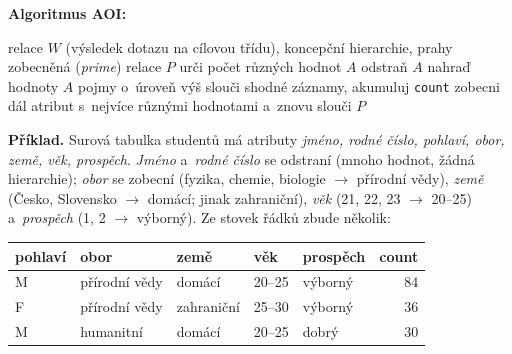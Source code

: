 \documentclass[11pt,a4paper]{article}
\theoremstyle{definition}
\begin{document}
\noindent\textbf{Algoritmus AOI:}
\begin{algorithmic}[1]
\Require relace $W$ (výsledek dotazu na cílovou třídu), koncepční hierarchie, prahy
\Ensure zobecněná (\emph{prime}) relace $P$
  \State urči počet různých hodnot $A$
    \State odstraň $A$ 
  \Else
      \State nahraď hodnoty $A$ pojmy o~úroveň výš 
    \EndWhile
  \EndIf
\EndFor
\State slouči shodné záznamy, akumuluj \texttt{count}
  \State zobecni dál atribut s~nejvíce různými hodnotami a~znovu slouči
\EndWhile
\State \Return $P$
\end{algorithmic}

\medskip
\noindent\textbf{Příklad.} Surová tabulka studentů má atributy
\emph{jméno, rodné číslo, pohlaví, obor, země, věk, prospěch}.
\emph{Jméno} a~\emph{rodné číslo} se odstraní (mnoho hodnot, žádná hierarchie);
\emph{obor} se zobecní (fyzika, chemie, biologie $\to$ přírodní vědy),
\emph{země} (Česko, Slovensko $\to$ domácí; jinak zahraniční),
\emph{věk} (21, 22, 23 $\to$ 20--25) a~\emph{prospěch} (1, 2 $\to$ výborný).
Ze stovek řádků zbude několik:

\begin{center}\small
\begin{tabular}{lllll r}
\toprule
\textbf{pohlaví} & \textbf{obor} & \textbf{země} & \textbf{věk} & \textbf{prospěch}
  & \textbf{count} \\
\midrule
M & přírodní vědy & domácí     & 20--25 & výborný & 84 \\
F & přírodní vědy & zahraniční & 25--30 & výborný & 36 \\
M & humanitní     & domácí     & 20--25 & dobrý   & 30 \\
\bottomrule
\end{tabular}
\end{center}
\end{document}
